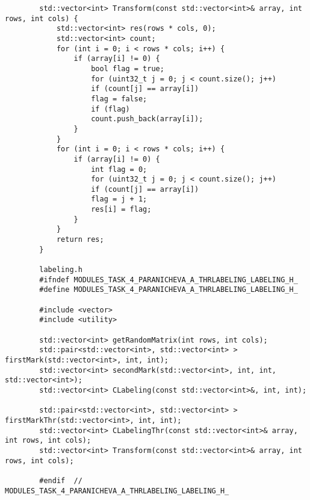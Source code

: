 \documentclass{report}
\begin{document}
\begin{lstlisting}
	    std::vector<int> Transform(const std::vector<int>& array, int rows, int cols) {
	    	std::vector<int> res(rows * cols, 0);
	    	std::vector<int> count;
	    	for (int i = 0; i < rows * cols; i++) {
	    		if (array[i] != 0) {
	    			bool flag = true;
	    			for (uint32_t j = 0; j < count.size(); j++)
	    			if (count[j] == array[i])
	    			flag = false;
	    			if (flag)
	    			count.push_back(array[i]);
	    		}
	    	}
	    	for (int i = 0; i < rows * cols; i++) {
	    		if (array[i] != 0) {
	    			int flag = 0;
	    			for (uint32_t j = 0; j < count.size(); j++)
	    			if (count[j] == array[i])
	    			flag = j + 1;
	    			res[i] = flag;
	    		}
	    	}
	    	return res;
	    }
	    
	    labeling.h
	    #ifndef MODULES_TASK_4_PARANICHEVA_A_THRLABELING_LABELING_H_
	    #define MODULES_TASK_4_PARANICHEVA_A_THRLABELING_LABELING_H_
	    
	    #include <vector>
	    #include <utility>
	    
	    std::vector<int> getRandomMatrix(int rows, int cols);
	    std::pair<std::vector<int>, std::vector<int> > firstMark(std::vector<int>, int, int);
	    std::vector<int> secondMark(std::vector<int>, int, int, std::vector<int>);
	    std::vector<int> CLabeling(const std::vector<int>&, int, int);
	    
	    std::pair<std::vector<int>, std::vector<int> > firstMarkThr(std::vector<int>, int, int);
	    std::vector<int> CLabelingThr(const std::vector<int>& array, int rows, int cols);
	    std::vector<int> Transform(const std::vector<int>& array, int rows, int cols);
	    
	    #endif  // MODULES_TASK_4_PARANICHEVA_A_THRLABELING_LABELING_H_
	\end{lstlisting}
\end{document}
